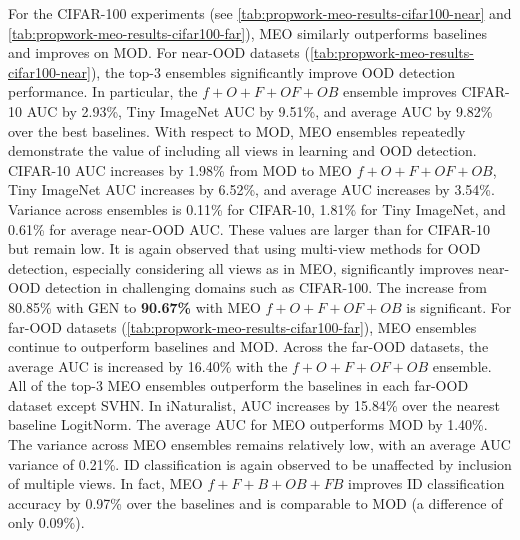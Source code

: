 For the CIFAR-100 experiments (see \ref{tab:propwork-meo-results-cifar100-near} and \ref{tab:propwork-meo-results-cifar100-far}), MEO similarly outperforms baselines and improves on MOD. For near-OOD datasets (\ref{tab:propwork-meo-results-cifar100-near}), the top-3 ensembles significantly improve OOD detection performance. In particular, the $f+O+F+OF+OB$ ensemble improves CIFAR-10 AUC by 2.93\%, Tiny ImageNet AUC by 9.51\%, and average AUC by 9.82\% over the best baselines. With respect to MOD, MEO ensembles repeatedly demonstrate the value of including all views in learning and OOD detection. CIFAR-10 AUC increases by 1.98\% from MOD to MEO $f+O+F+OF+OB$, Tiny ImageNet AUC increases by 6.52\%, and average AUC increases by 3.54\%. Variance across ensembles is 0.11\% for CIFAR-10, 1.81\% for Tiny ImageNet, and 0.61\% for average near-OOD AUC. These values are larger than for CIFAR-10 but remain low. It is again observed that using multi-view methods for OOD detection, especially considering all views as in MEO, significantly improves near-OOD detection in challenging domains such as CIFAR-100. The increase from 80.85\% with GEN to \textbf{90.67\%} with MEO $f+O+F+OF+OB$ is significant.
For far-OOD datasets (\ref{tab:propwork-meo-results-cifar100-far}), MEO ensembles continue to outperform baselines and MOD. Across the far-OOD datasets, the average AUC is increased by 16.40\% with the $f+O+F+OF+OB$ ensemble. All of the top-3 MEO ensembles outperform the baselines in each far-OOD dataset except SVHN. In iNaturalist, AUC increases by 15.84\% over the nearest baseline LogitNorm. The average AUC for MEO outperforms MOD by 1.40\%. The variance across MEO ensembles remains relatively low, with an average AUC variance of 0.21\%. ID classification is again observed to be unaffected by inclusion of multiple views. In fact, MEO $f+F+B+OB+FB$ improves ID classification accuracy by 0.97\% over the baselines and is comparable to MOD (a difference of only 0.09\%).

